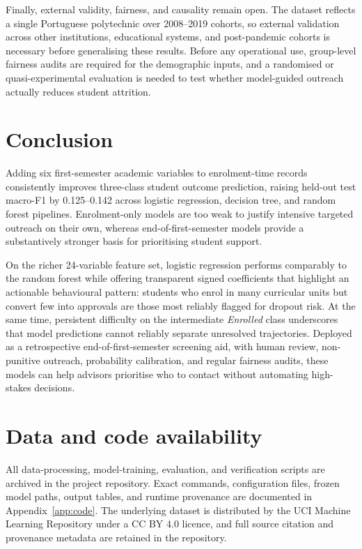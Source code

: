 \documentclass[11pt,a4paper]{article}
\newcommand{\Enrolled}{\textit{Enrolled}}
\begin{document}
Finally, external validity, fairness, and causality remain open. The dataset reflects a single
Portuguese polytechnic over 2008--2019 cohorts, so external validation across other institutions,
educational systems, and post-pandemic cohorts is necessary before generalising these results.
Before any operational use, group-level fairness audits are required for the demographic inputs,
and a randomised or quasi-experimental evaluation is needed to test whether model-guided outreach
actually reduces student attrition.

\section{Conclusion}

Adding six first-semester academic variables to enrolment-time records consistently improves
three-class student outcome prediction, raising held-out test macro-F1 by 0.125--0.142 across
logistic regression, decision tree, and random forest pipelines. Enrolment-only models are too weak
to justify intensive targeted outreach on their own, whereas end-of-first-semester models provide a
substantively stronger basis for prioritising student support.

On the richer 24-variable feature set, logistic regression performs comparably to the random forest
while offering transparent signed coefficients that highlight an actionable behavioural pattern:
students who enrol in many curricular units but convert few into approvals are those most reliably
flagged for dropout risk. At the same time, persistent difficulty on the intermediate \Enrolled{}
class underscores that model predictions cannot reliably separate unresolved trajectories. Deployed
as a retrospective end-of-first-semester screening aid, with human review, non-punitive outreach,
probability calibration, and regular fairness audits, these models can help advisors prioritise who
to contact without automating high-stakes decisions.

\section*{Data and code availability}

All data-processing, model-training, evaluation, and verification scripts are archived in the
project repository. Exact commands, configuration files, frozen model paths, output tables, and
runtime provenance are documented in Appendix~\ref{app:code}. The underlying dataset is distributed
by the UCI Machine Learning Repository under a CC BY 4.0 licence, and full source citation and
provenance metadata are retained in the repository.

\appendix


{\small
\setlength{\bibsep}{2pt plus 1pt}


}
\end{document}
